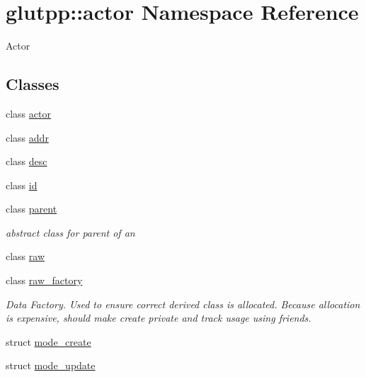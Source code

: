 \hypertarget{namespaceglutpp_1_1actor}{\section{glutpp\-:\-:actor \-Namespace \-Reference}
\label{namespaceglutpp_1_1actor}
}


\-Actor  


\subsection*{\-Classes}
\begin{DoxyCompactItemize}
\item 
class \hyperlink{classglutpp_1_1actor_1_1actor}{actor}
\item 
class \hyperlink{classglutpp_1_1actor_1_1addr}{addr}
\item 
class \hyperlink{classglutpp_1_1actor_1_1desc}{desc}
\item 
class \hyperlink{classglutpp_1_1actor_1_1id}{id}
\item 
class \hyperlink{classglutpp_1_1actor_1_1parent}{parent}
\begin{DoxyCompactList}\small\item\em abstract class for parent of an  \end{DoxyCompactList}\item 
class \hyperlink{classglutpp_1_1actor_1_1raw}{raw}
\item 
class \hyperlink{classglutpp_1_1actor_1_1raw__factory}{raw\-\_\-factory}
\begin{DoxyCompactList}\small\item\em \-Data \-Factory. \-Used to ensure correct derived class is allocated. \-Because allocation is expensive, should make {\ttfamily create} private and track usage using friends. \end{DoxyCompactList}\item 
struct \hyperlink{structglutpp_1_1actor_1_1mode__create}{mode\-\_\-create}
\item 
struct \hyperlink{structglutpp_1_1actor_1_1mode__update}{mode\-\_\-update}
\end{DoxyCompactItemize}
